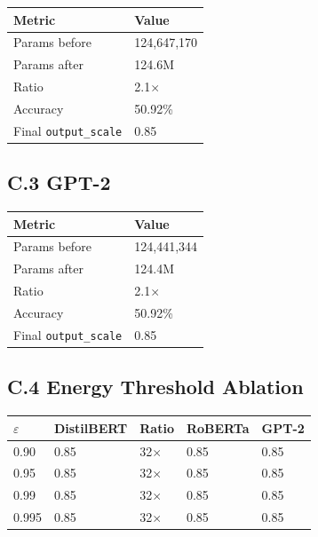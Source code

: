 \begin{table}[H]
\centering
\small
\begin{tabular}{ll}
\toprule
\textbf{Metric} & \textbf{Value} \\
\midrule
Params before & 124,647,170 \\
Params after & 124.6M \\
Ratio & 2.1$\times$ \\
Accuracy & 50.92\% \\
Final \texttt{output\_scale} & 0.85 \\
\bottomrule
\end{tabular}
\end{table}

\subsection{C.3 GPT-2}

\begin{table}[H]
\centering
\small
\begin{tabular}{ll}
\toprule
\textbf{Metric} & \textbf{Value} \\
\midrule
Params before & 124,441,344 \\
Params after & 124.4M \\
Ratio & 2.1$\times$ \\
Accuracy & 50.92\% \\
Final \texttt{output\_scale} & 0.85 \\
\bottomrule
\end{tabular}
\end{table}

\subsection{C.4 Energy Threshold Ablation}

\begin{table}[H]
\centering
\small
\begin{tabular}{lllll}
\toprule
\textbf{$\varepsilon$} & \textbf{DistilBERT} & \textbf{Ratio} & \textbf{RoBERTa} & \textbf{GPT-2} \\
\midrule
0.90 & 0.85 & 32$\times$ & 0.85 & 0.85 \\
0.95 & 0.85 & 32$\times$ & 0.85 & 0.85 \\
0.99 & 0.85 & 32$\times$ & 0.85 & 0.85 \\
0.995 & 0.85 & 32$\times$ & 0.85 & 0.85 \\
\bottomrule
\end{tabular}
\end{table}

